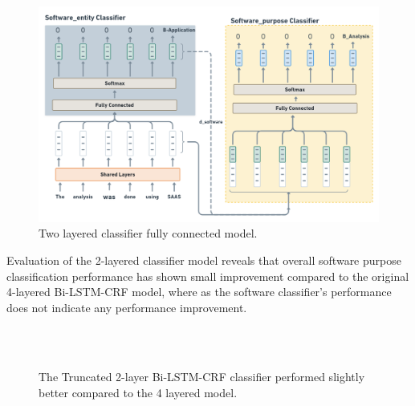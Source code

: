 \begin{figure}[htbp]
	\centering
	\includegraphics[width=.90\textwidth]{4.graphics/figures/ch_5/2LC}
	\caption{Two layered classifier fully connected model.}
	\label{fig:chapter06:with}
\end{figure}

Evaluation of the 2-layered classifier model reveals that overall software purpose classification performance has shown small improvement compared to the original 4-layered \ac{Bi-LSTM-CRF} model, where as the software classifier’s performance does not indicate any performance improvement.  

\begin{figure}[h]
	
	\myfloatalign
	
	 \\
	\\
	\caption{The Truncated 2-layer \ac{Bi-LSTM-CRF} classifier performed slightly better compared to the 4 layered model.}
\end{figure}


